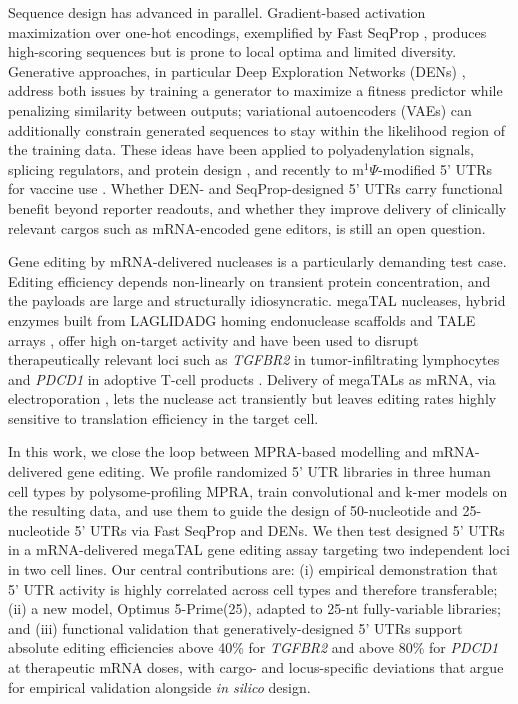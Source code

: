 Sequence design has advanced in parallel. Gradient-based activation
maximization over one-hot encodings, exemplified by Fast SeqProp
\cite{linder2021fastseqprop}, produces high-scoring sequences but is
prone to local optima and limited diversity. Generative approaches, in
particular Deep Exploration Networks (DENs)
\cite{linder2020den}, address both issues by training a generator to
maximize a fitness predictor while penalizing similarity between outputs;
variational autoencoders (VAEs) can additionally constrain generated
sequences to stay within the likelihood region of the training data.
These ideas have been applied to polyadenylation signals, splicing
regulators, and protein design
\cite{linder2020den,lei2025promoterdiffusion,zhao2024promotergan},
and recently to m$^1$$\Psi$-modified 5' UTRs for vaccine use
\cite{tang2023smart5utr,kim2026lnp_utr}. Whether DEN- and SeqProp-designed
5' UTRs carry functional benefit beyond reporter readouts, and whether
they improve delivery of clinically relevant cargos such as mRNA-encoded
gene editors, is still an open question.

Gene editing by mRNA-delivered nucleases is a particularly demanding
test case. Editing efficiency depends non-linearly on transient
protein concentration, and the payloads are large and structurally
idiosyncratic. megaTAL nucleases, hybrid enzymes built from LAGLIDADG
homing endonuclease scaffolds and TALE arrays
\cite{mcmurrough2018laglidadg,laforet2019endonuclease,gwiazda2016tcellediting},
offer high on-target activity and have been used to disrupt
therapeutically relevant loci such as \emph{TGFBR2} in
tumor-infiltrating lymphocytes \cite{fix2022tgfbr2} and \emph{PDCD1}
in adoptive T-cell products \cite{mohammad2025pd1}. Delivery of
megaTALs as mRNA, via electroporation
\cite{schwarze2021electroporation,gwiazda2016tcellediting}, lets the
nuclease act transiently but leaves editing rates highly sensitive to
translation efficiency in the target cell.

In this work, we close the loop between MPRA-based modelling and
mRNA-delivered gene editing. We profile randomized 5' UTR libraries in
three human cell types by polysome-profiling MPRA, train convolutional
and k-mer models on the resulting data, and use them to guide the
design of 50-nucleotide and 25-nucleotide 5' UTRs via Fast SeqProp and
DENs. We then test designed 5' UTRs in a mRNA-delivered megaTAL gene
editing assay targeting two independent loci in two cell lines. Our
central contributions are: (i) empirical demonstration that 5' UTR
activity is highly correlated across cell types and therefore transferable;
(ii) a new model, Optimus 5-Prime(25), adapted to 25-nt fully-variable
libraries; and (iii) functional validation that generatively-designed
5' UTRs support absolute editing efficiencies above 40\% for
\emph{TGFBR2} and above 80\% for \emph{PDCD1} at therapeutic mRNA doses,
with cargo- and locus-specific deviations that argue for empirical
validation alongside \emph{in silico} design.

